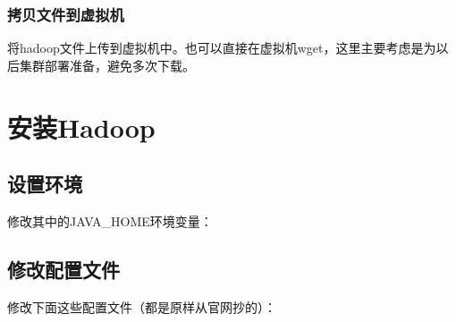 \documentclass[12pt]{article}
\begin{document}
\subsubsection{拷贝文件到虚拟机}\label{ux62f7ux8d1dux6587ux4ef6ux5230ux865aux62dfux673a}

将hadoop文件上传到虚拟机中。也可以直接在虚拟机wget，这里主要考虑是为以后集群部署准备，避免多次下载。

\begin{Shaded}
\begin{Highlighting}[]
\end{Highlighting}
\end{Shaded}

\section{安装Hadoop}\label{ux5b89ux88c5hadoop}

\subsection{设置环境}\label{ux8bbeux7f6eux73afux5883}

\begin{Shaded}
\begin{Highlighting}[]
 
\end{Highlighting}
\end{Shaded}

修改其中的JAVA\_HOME环境变量：

\begin{Shaded}
\begin{Highlighting}[]
 \OperatorTok{=}

\end{Highlighting}
\end{Shaded}

\subsection{修改配置文件}\label{ux4feeux6539ux914dux7f6eux6587ux4ef6}

修改下面这些配置文件（都是原样从官网抄的）：
\end{document}
